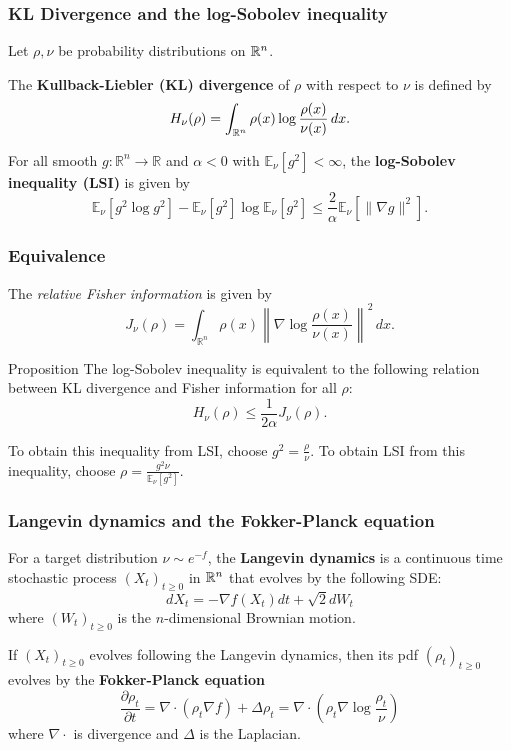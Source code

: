 \documentclass[xcolor=dvipsnames]{beamer}
\begin{document}
    \begin{frame}
    \frametitle{KL Divergence and the log-Sobolev inequality} 
    Let $\rho, \nu$ be probability distributions on  $\mathbb{R}^n $.
    \begin{definition}
       The \textbf{Kullback-Liebler (KL) divergence} of $\rho $ with respect to $\nu$ is defined by \[
       H_{\nu}(\rho)= \int_{\mathbb{R}^n } \rho(x) \log \frac{\rho(x)}{\nu(x)} \, dx.
       \] 
    \end{definition}
    \begin{definition}
 For all smooth $g \colon \mathbb R^n \to \mathbb R$ and $\alpha<0$ with $\mathbb E_{\nu}[g^{2}]< \infty$, the \textbf{log-Sobolev inequality (LSI)}  is given by \[
\mathbb E_{\nu}[g^{2} \log g^{2}]-\mathbb E_{\nu}[g^{2}]\log \mathbb E_{\nu}[g^{2}] \leq \frac{2}{\alpha}\mathbb E_{\nu}[ \|\nabla g\|^{2}].
\]
    \end{definition}
    \end{frame}
    \begin{frame}
    \frametitle{Equivalence} 
    \begin{definition}
        
The \emph{relative Fisher information}  is given by 
\[
J_{\nu}(\rho)=\int_{\mathbb R^n}^{} \rho(x)\left\|  \nabla \log \frac{\rho(x)}{\nu(x)}\right\|^{2} \, dx.
\] 
\end{definition} 
    \begin{block}{Proposition} 
The log-Sobolev inequality is equivalent to the following relation between KL divergence and Fisher information for all $\rho$: \[
H_{\nu}(\rho) \leq \frac{1}{2\alpha } J_{\nu}(\rho).
\] 
    \end{block}
    To obtain this inequality from LSI, choose $g^2=\frac{\rho}{\nu}$. To obtain LSI from this inequality, choose $\rho = \frac{g^2\nu}{\mathbb E_{\nu} [g^2]}$.
    \end{frame}

    \begin{frame}
        \frametitle{Langevin dynamics and the Fokker-Planck equation} 
        \begin{definition}[]
            For a target distribution $\nu \sim e ^{-f}$, the  \textbf{Langevin dynamics} is a continuous time stochastic process $(X_t)_{t \geq 0}$ in $\mathbb{R}^n $ that evolves by the following SDE: \[
            d X_{t}= - \nabla f (X_{t})dt + \sqrt{ 2 } d W_{t}
            \] where $(W_t)_{t\geq 0}$ is the $n$-dimensional Brownian motion.
        \end{definition}
        \begin{definition}[]
           If $(X_t)_{t \geq 0}$ evolves following the Langevin dynamics, then its pdf $(\rho_t)_{t\geq 0}$ evolves by the \textbf{Fokker-Planck equation} \[
               \frac{ \partial \rho _t }{ \partial t } = \nabla \cdot  (\rho _t \nabla f)+ \Delta \rho _t= \nabla \cdot  \left( \rho _t \nabla \log \frac{\rho _t}{\nu} \right)
           \] 
           where $\nabla \cdot $ is divergence and $\Delta $ is the Laplacian.
        \end{definition}
    \end{frame}
\end{document}
